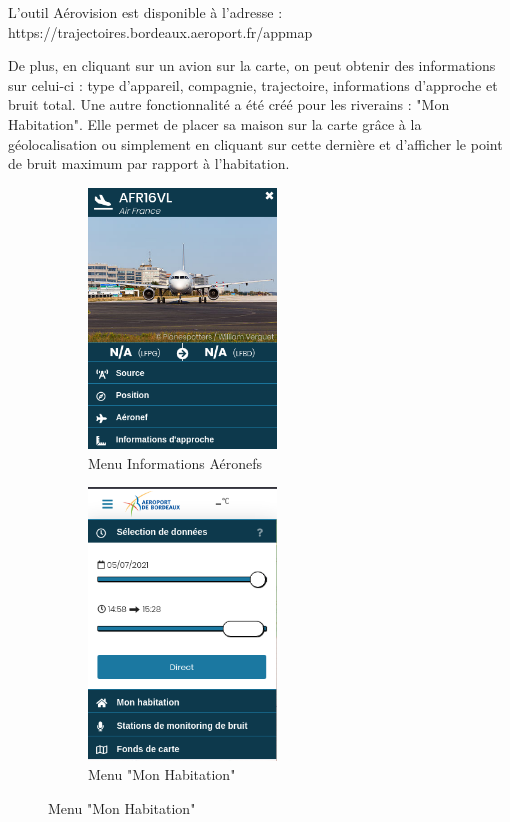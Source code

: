 L'outil Aérovision est disponible à l'adresse : https://trajectoires.bordeaux.aeroport.fr/appmap\newline

De plus, en cliquant sur un avion sur la carte, on peut obtenir des informations sur celui-ci : type d'appareil, compagnie, trajectoire, informations d'approche et bruit total.
Une autre fonctionnalité a été créé pour les riverains : "Mon Habitation". Elle permet de placer sa maison sur la carte grâce à la géolocalisation ou simplement en cliquant sur cette dernière et d'afficher le point de bruit maximum par rapport à l'habitation.

\begin{figure}[hbt!]
  \begin{subfigure}{0.5\textwidth}
    \centering
    \includegraphics[width=5cm]{Images/aerovisioninfo.png}  
    \caption{Menu Informations Aéronefs}
    \label{fig:aerovisioninfo}
  \end{subfigure}
  \begin{subfigure}{0.5\textwidth}
    \centering
    \includegraphics[width=5cm]{Images/aerovisionmaison.png}  
    \caption{Menu "Mon Habitation"}
    \label{fig:aerovisionmaison}
  \end{subfigure}
\end{figure}

